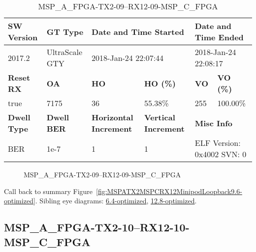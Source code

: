 \begin{table}[h]
\centering
\caption{MSP\_A\_FPGA-TX2-09--RX12-09-MSP\_C\_FPGA}
\label{tab:MSPAFPGATX209RX1209MSPCFPGA9.6-optimized}
\begin{tabular}{@{}|l|l|l|l|l|l|@{}}
\toprule
\textbf{SW Version}                & \textbf{GT Type}   & \multicolumn{2}{l|}{\textbf{Date and Time Started}}            & \multicolumn{2}{l|}{\textbf{Date and Time Ended}}        \\ \midrule
2017.2                       & UltraScale GTY          & \multicolumn{2}{l|}{2018-Jan-24 22:07:44}                   & \multicolumn{2}{l|}{2018-Jan-24 22:08:17}               \\ \midrule
\textbf{Reset RX}                  & \textbf{OA} & \textbf{HO}   & \textbf{HO (\%)} & \textbf{VO} & \textbf{VO (\%)} \\ \midrule
true & 7175        & 36          & 55.38\%        & 255        & 100.00\%       \\ \midrule
\textbf{Dwell Type}                & \textbf{Dwell BER} & \textbf{Horizontal Increment} & \textbf{Vertical Increment}    & \multicolumn{2}{l|}{\textbf{Misc Info}}                  \\ \midrule
BER                            & 1e-7        & 1        & 1           & \multicolumn{2}{l|}{ELF Version: 0x4002 SVN: 0}                         \\ \bottomrule
\end{tabular}
\end{table}

\begin{figure}[h]
\caption{MSP\_A\_FPGA-TX2-09--RX12-09-MSP\_C\_FPGA} \label{fig:MSPAFPGATX209RX1209MSPCFPGA9.6-optimized}
\end{figure}

Call back to summary Figure~\ref{fig:MSPATX2MSPCRX12MinipodLoopback9.6-optimized}.
Sibling eye diagrams: \hyperref[sec:MSPAFPGATX209RX1209MSPCFPGA6.4-optimized]{6.4-optimized}, \hyperref[sec:MSPAFPGATX209RX1209MSPCFPGA12.8-optimized]{12.8-optimized}.

\clearpage
\newpage


\subsection{MSP\_A\_FPGA-TX2-10--RX12-10-MSP\_C\_FPGA}\label{sec:MSPAFPGATX210RX1210MSPCFPGA9.6-optimized}

